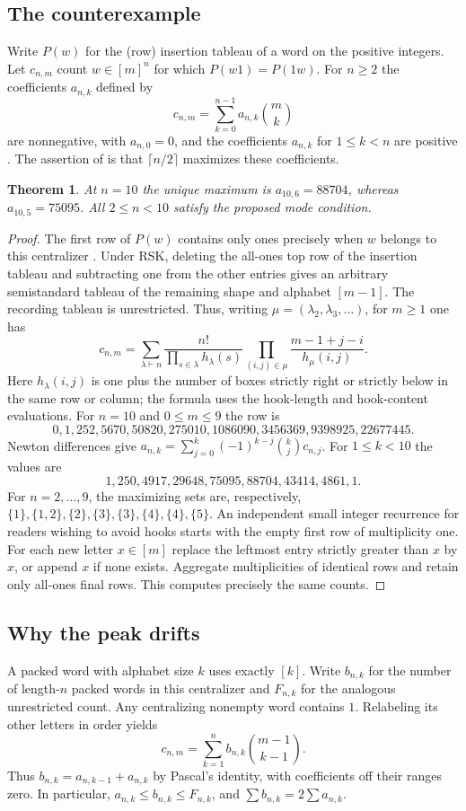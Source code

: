 \documentclass[11pt,a4paper]{article}
\newtheorem{SourceRceKtheorem}{Theorem}
\begin{document}
\subsection{The counterexample}
Write $P(w)$ for the (row) insertion tableau of a word on the positive integers.
Let $c_{n,m}$ count $w\in[m]^n$ for which $P(w1)=P(1w)$.
For $n\ge2$ the coefficients $a_{n,k}$ defined by
\[
 c_{n,m}=\sum_{k=0}^{n-1}a_{n,k}\binom{m}{k}
\]
are nonnegative, with $a_{n,0}=0$, and the coefficients $a_{n,k}$ for $1\le k<n$ are positive \cite[Thm.~4.2]{R24K:SZ}. The assertion of \cite[Conj.~7.3(d)]{R24K:SW} is that $\lceil n/2\rceil$ maximizes these coefficients.
\begin{SourceRceKtheorem}
At $n=10$ the unique maximum is $a_{10,6}=88704$, whereas $a_{10,5}=75095$. All $2\le n<10$ satisfy the proposed mode condition.
\end{SourceRceKtheorem}
\begin{proof}
The first row of $P(w)$ contains only ones precisely when $w$ belongs to this centralizer \cite[Prop.~2.5]{R24K:SZ}. Under RSK, deleting the all-ones top row of the insertion tableau and subtracting one from the other entries gives an arbitrary semistandard tableau of the remaining shape and alphabet $[m-1]$. The recording tableau is unrestricted. Thus, writing $\mu=(\lambda_2,\lambda_3,\dots)$, for $m\ge1$ one has
\[
 c_{n,m}=\sum_{\lambda\vdash n}
 \frac{n!}{\prod_{s\in\lambda}h_{\lambda}(s)}
 \prod_{(i,j)\in\mu}\frac{m-1+j-i}{h_{\mu}(i,j)} .
\]
Here $h_\lambda(i,j)$ is one plus the number of boxes strictly right or strictly below in the same row or column; the formula uses the hook-length and hook-content evaluations. For $n=10$ and $0\le m\le9$ the row is
\[
0,1,252,5670,50820,275010,1086090,3456369,9398925,22677445.
\]
Newton differences give $a_{n,k}=\sum_{j=0}^k(-1)^{k-j}\binom{k}{j}c_{n,j}$. For $1\le k<10$ the values are
\[
1,250,4917,29648,75095,88704,43414,4861,1 .
\]
For $n=2,\ldots,9$, the maximizing sets are, respectively,
$\{1\},\{1,2\},\{2\},\{3\},\{3\},\{4\},\{4\},\{5\}$.
An independent small integer recurrence for readers wishing to avoid hooks starts with the empty first row of multiplicity one. For each new letter $x\in[m]$ replace the leftmost entry strictly greater than $x$ by $x$, or append $x$ if none exists. Aggregate multiplicities of identical rows and retain only all-ones final rows. This computes precisely the same counts.
\end{proof}

\subsection{Why the peak drifts}
A packed word with alphabet size $k$ uses exactly $[k]$. Write $b_{n,k}$ for the number of length-$n$ packed words in this centralizer and $F_{n,k}$ for the analogous unrestricted count. Any centralizing nonempty word contains $1$. Relabeling its other letters in order yields \cite[Thm.~4.3]{R24K:SZ}
\[
 c_{n,m}=\sum_{k=1}^n b_{n,k}\binom{m-1}{k-1}.
\]
Thus $b_{n,k}=a_{n,k-1}+a_{n,k}$ by Pascal's identity, with coefficients off their ranges zero. In particular, $a_{n,k}\le b_{n,k}\le F_{n,k}$, and $\sum b_{n,k}=2\sum a_{n,k}$.
\end{document}
